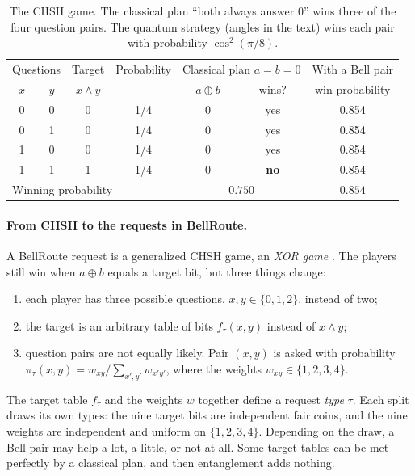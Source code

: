 \documentclass[10pt]{article}
\newcommand{\xor}{\mathbin{\oplus}}
\begin{document}
\begin{table}[H]
\centering\small
\caption{The CHSH game. The classical plan ``both always answer 0'' wins three of the four question pairs. The quantum strategy (angles in the text) wins each pair with probability $\cos^2(\pi/8)$.}
\label{tab:chsh}
\begin{tabular}{@{}cc|cc|cc|c@{}}
\toprule
\multicolumn{2}{c|}{Questions} & Target & Probability & \multicolumn{2}{c|}{Classical plan $a=b=0$} & With a Bell pair \\
$x$ & $y$ & $x\wedge y$ & & $a\xor b$ & wins? & win probability \\
\midrule
0 & 0 & 0 & 1/4 & 0 & yes & 0.854 \\
0 & 1 & 0 & 1/4 & 0 & yes & 0.854 \\
1 & 0 & 0 & 1/4 & 0 & yes & 0.854 \\
1 & 1 & 1 & 1/4 & 0 & \textbf{no} & 0.854 \\
\midrule
\multicolumn{4}{l|}{Winning probability} & \multicolumn{2}{c|}{$0.750$} & $0.854$ \\
\bottomrule
\end{tabular}
\end{table}

\paragraph{From CHSH to the requests in BellRoute.} A BellRoute request is a generalized CHSH game, an \emph{XOR game} \citep{cleve2004consequences}. The players still win when $a\xor b$ equals a target bit, but three things change:
\begin{enumerate}[leftmargin=*]
  \item each player has three possible questions, $x,y\in\{0,1,2\}$, instead of two;
  \item the target is an arbitrary table of bits $f_\tau(x,y)$ instead of $x\wedge y$;
  \item question pairs are not equally likely. Pair $(x,y)$ is asked with probability $\pi_\tau(x,y)=w_{xy}/\sum_{x',y'}w_{x'y'}$, where the weights $w_{xy}\in\{1,2,3,4\}$.
\end{enumerate}
The target table $f_\tau$ and the weights $w$ together define a request \emph{type} $\tau$. Each split draws its own types: the nine target bits are independent fair coins, and the nine weights are independent and uniform on $\{1,2,3,4\}$. Depending on the draw, a Bell pair may help a lot, a little, or not at all. Some target tables can be met perfectly by a classical plan, and then entanglement adds nothing.
\end{document}
